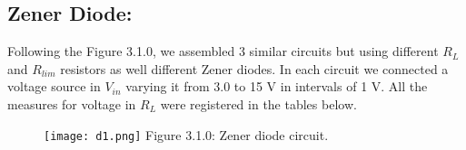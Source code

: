 \subsection{Zener Diode:}

Following the Figure 3.1.0, we assembled 3 similar circuits but using different $R_{L}$ and $R_{lim}$ resistors as well different Zener diodes. In each circuit we connected a voltage source in $V_{in}$ varying it from 3.0 to 15 V in intervals of 1 V. All the measures for voltage in $R_{L}$ were registered in the tables below.

\begin{figure}[H]
\texttt{[image: d1.png]}
\centering \linebreak \linebreak Figure 3.1.0: Zener diode circuit.
\end{figure}

{\bfseries\itshape\color{armygreen}{Observation:}} {\itshape{}}

